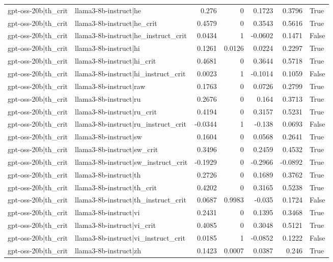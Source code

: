 \begin{table}
\begin{tabular}{l l r r r r l}
gpt-oss-20b|th_crit & llama3-8b-instruct|he & 0.276 & 0 & 0.1723 & 0.3796 & True \\
gpt-oss-20b|th_crit & llama3-8b-instruct|he_crit & 0.4579 & 0 & 0.3543 & 0.5616 & True \\
gpt-oss-20b|th_crit & llama3-8b-instruct|he_instruct_crit & 0.0434 & 1 & -0.0602 & 0.1471 & False \\
gpt-oss-20b|th_crit & llama3-8b-instruct|hi & 0.1261 & 0.0126 & 0.0224 & 0.2297 & True \\
gpt-oss-20b|th_crit & llama3-8b-instruct|hi_crit & 0.4681 & 0 & 0.3644 & 0.5718 & True \\
gpt-oss-20b|th_crit & llama3-8b-instruct|hi_instruct_crit & 0.0023 & 1 & -0.1014 & 0.1059 & False \\
gpt-oss-20b|th_crit & llama3-8b-instruct|raw & 0.1763 & 0 & 0.0726 & 0.2799 & True \\
gpt-oss-20b|th_crit & llama3-8b-instruct|ru & 0.2676 & 0 & 0.164 & 0.3713 & True \\
gpt-oss-20b|th_crit & llama3-8b-instruct|ru_crit & 0.4194 & 0 & 0.3157 & 0.5231 & True \\
gpt-oss-20b|th_crit & llama3-8b-instruct|ru_instruct_crit & -0.0344 & 1 & -0.138 & 0.0693 & False \\
gpt-oss-20b|th_crit & llama3-8b-instruct|sw & 0.1604 & 0 & 0.0568 & 0.2641 & True \\
gpt-oss-20b|th_crit & llama3-8b-instruct|sw_crit & 0.3496 & 0 & 0.2459 & 0.4532 & True \\
gpt-oss-20b|th_crit & llama3-8b-instruct|sw_instruct_crit & -0.1929 & 0 & -0.2966 & -0.0892 & True \\
gpt-oss-20b|th_crit & llama3-8b-instruct|th & 0.2726 & 0 & 0.1689 & 0.3762 & True \\
gpt-oss-20b|th_crit & llama3-8b-instruct|th_crit & 0.4202 & 0 & 0.3165 & 0.5238 & True \\
gpt-oss-20b|th_crit & llama3-8b-instruct|th_instruct_crit & 0.0687 & 0.9983 & -0.035 & 0.1724 & False \\
gpt-oss-20b|th_crit & llama3-8b-instruct|vi & 0.2431 & 0 & 0.1395 & 0.3468 & True \\
gpt-oss-20b|th_crit & llama3-8b-instruct|vi_crit & 0.4085 & 0 & 0.3048 & 0.5121 & True \\
gpt-oss-20b|th_crit & llama3-8b-instruct|vi_instruct_crit & 0.0185 & 1 & -0.0852 & 0.1222 & False \\
gpt-oss-20b|th_crit & llama3-8b-instruct|zh & 0.1423 & 0.0007 & 0.0387 & 0.246 & True \\

\end{tabular}
\end{table}

